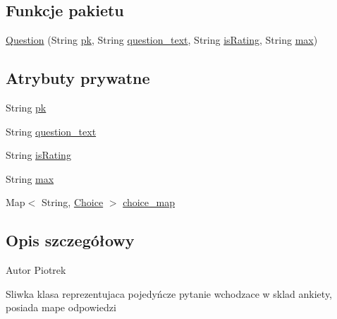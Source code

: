 \subsection*{Funkcje pakietu}
\begin{DoxyCompactItemize}
\item 
\hyperlink{classcom_1_1example_1_1qrpoll_1_1_question_aeeae84aca53cbbce8820daf91436564c}{Question} (String \hyperlink{classcom_1_1example_1_1qrpoll_1_1_question_ab94e31e243d24239faf4ae4c68c28f0b}{pk}, String \hyperlink{classcom_1_1example_1_1qrpoll_1_1_question_ab90d61211a23303be8fe8139aed31754}{question\+\_\+text}, String \hyperlink{classcom_1_1example_1_1qrpoll_1_1_question_a7b9016a004baf976a3d700ce332c0e1b}{is\+Rating}, String \hyperlink{classcom_1_1example_1_1qrpoll_1_1_question_a07bd283882253cc7c9ab69718a692a64}{max})
\end{DoxyCompactItemize}
\subsection*{Atrybuty prywatne}
\begin{DoxyCompactItemize}
\item 
String \hyperlink{classcom_1_1example_1_1qrpoll_1_1_question_ab94e31e243d24239faf4ae4c68c28f0b}{pk}
\item 
String \hyperlink{classcom_1_1example_1_1qrpoll_1_1_question_ab90d61211a23303be8fe8139aed31754}{question\+\_\+text}
\item 
String \hyperlink{classcom_1_1example_1_1qrpoll_1_1_question_a7b9016a004baf976a3d700ce332c0e1b}{is\+Rating}
\item 
String \hyperlink{classcom_1_1example_1_1qrpoll_1_1_question_a07bd283882253cc7c9ab69718a692a64}{max}
\item 
Map$<$ String, \hyperlink{classcom_1_1example_1_1qrpoll_1_1_choice}{Choice} $>$ \hyperlink{classcom_1_1example_1_1qrpoll_1_1_question_aa382153815db46e065ab637ef86f9265}{choice\+\_\+map}
\end{DoxyCompactItemize}


\subsection{Opis szczegółowy}
\begin{DoxyAuthor}{Autor}
Piotrek 

Sliwka klasa reprezentujaca pojedyńcze pytanie wchodzace w sklad ankiety, posiada mape odpowiedzi 
\end{DoxyAuthor}


